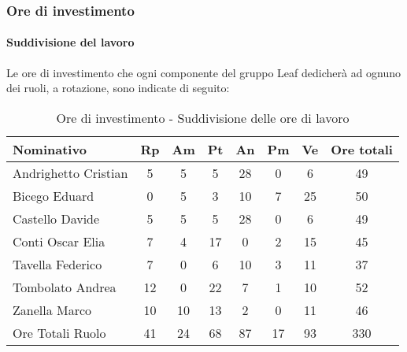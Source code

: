 \documentclass[../PianoProgetto.tex]{subfiles}
\begin{document}
	\subsubsection{Ore di investimento}
				\paragraph{Suddivisione del lavoro}
					Le ore di investimento che ogni componente del gruppo Leaf dedicherà ad ognuno dei ruoli, a rotazione, sono indicate di seguito:
	
					\begin{table}[h]
		\centering
	
		\begin{tabular}{l * {7}{c}}
			\toprule
			Nominativo & Rp & Am & Pt & An & Pm & Ve & Ore totali \\
			\midrule
			Andrighetto Cristian & 5 & 5 & 5 & 28 &	0 &	6 &	49 \\
			\midrule
			Bicego Eduard & 0 & 5 & 3 & 10 & 7 & 25 & 50 \\
			\midrule
			Castello Davide & 5 & 5 & 5 & 28 & 0 & 6 & 49 \\
			\midrule
			Conti Oscar Elia & 7 & 4 & 17 & 0 & 2 & 15 & 45 \\
			\midrule
			Tavella Federico &	7 & 0 & 6 & 10 & 3 & 11 & 37 \\
			\midrule
			Tombolato Andrea & 12 & 0 & 22 & 7 & 1 & 10 & 52 \\
			\midrule
			Zanella Marco & 10 & 10 & 13 & 2 & 0 & 11 & 46 \\
			\midrule			
			Ore Totali Ruolo & 41 & 24 & 68 & 87 & 17 & 93 & 330 \\
			\bottomrule
			
		\end{tabular}
		
		\caption{Ore di investimento - Suddivisione delle ore di lavoro}
		\label{tab:investimento_ore}
		
	\end{table}
	
	
\end{document}
